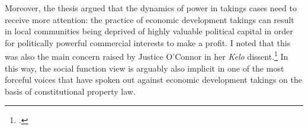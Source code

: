 {{%





Moreover, the thesis argued that the dynamics of power in takings cases need to receive more attention: the practice of economic development takings can result in local communities being deprived of highly valuable political capital in order for politically powerful commercial interests to make a profit. I noted that this was also the main concern raised by Justice O'Connor in her {\it Kelo} dissent.\footnote{\cite{kelo05}.} In this way, the social function view is arguably also implicit in one of the most forceful voices that have spoken out against economic development takings on the basis of constitutional property law.

}}
